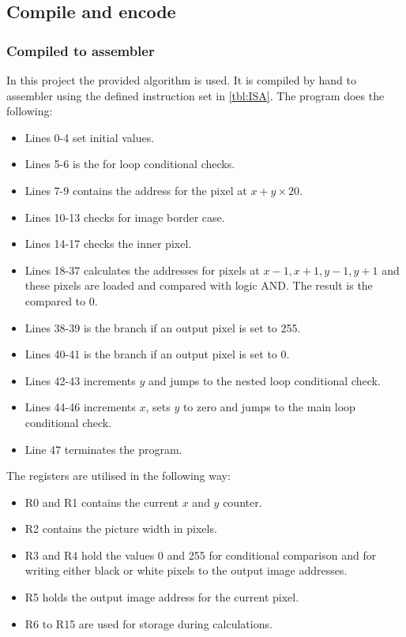 \documentclass[a4paper, english]{article}
\numberwithin{equation}{section}
\begin{document}
\subsection{Compile and encode}\label{sec:compileandencode}
\subsubsection{Compiled to assembler}
In this project the provided algorithm is used. It is compiled by hand to assembler using the defined instruction set in \cref{tbl:ISA}. The program does the following:
\begin{itemize}
    \item Lines 0-4 set initial values.
    \item Lines 5-6 is the for loop conditional checks.
    \item Lines 7-9 contains the address for the pixel at \(x + y \times 20\).
    \item Lines 10-13 checks for image border case.
    \item Lines 14-17 checks the inner pixel.
    \item Lines 18-37 calculates the addresses for pixels at \(x - 1, x + 1, y - 1, y + 1\) and these pixels are loaded and compared with logic AND. The result is the compared to 0.
    \item Lines 38-39 is the branch if an output pixel is set to 255.
    \item Lines 40-41 is the branch if an output pixel is set to 0.
    \item Lines 42-43 increments \(y\) and jumps to the nested loop conditional check.
    \item Lines 44-46 increments \(x\), sets \(y\) to zero and jumps to the main loop conditional check.
    \item Line 47 terminates the program.
\end{itemize}
The registers are utilised in the following way:
\begin{itemize}
    \item R0 and R1 contains the current \(x\) and \(y\) counter.
    \item R2 contains the picture width in pixels.
    \item R3 and R4 hold the values 0 and 255 for conditional comparison and for writing either black or white pixels to the output image addresses.
    \item R5 holds the output image address for the current pixel.
    \item R6 to R15 are used for storage during calculations.
\end{itemize}
\end{document}
